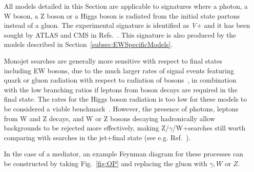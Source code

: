 
All models detailed in this Section are applicable to signatures where 
a photon, a W boson, a Z boson or a Higgs boson
is radiated from the initial state partons instead of a gluon. 
The experimental signature is identified as \textit{V+\MET} and it
has been sought by ATLAS and CMS in Refs.~\cite{Khachatryan:2014rwa,Aad:2014tda,Khachatryan:2014tva,ATLAS:2014wra,Aad:2013oja,Aad:2014vka}. 
This signature is also produced by the models described in 
Section~\ref{subsec:EWSpecificModels}. 

Monojet searches are generally more sensitive
with respect to final states including EW bosons, due to the much
larger rates of signal events featuring quark or gluon radiation with
respect to radiation of bosons~\cite{Zhou:2013fla},
in combination with the low branching ratios if leptons from
boson decays are required in the final state.
The rates for the Higgs boson radiation is too low for these models
to be considered a viable benchmark~\cite{Carpenter:2013xra}.
However, the presence of photons,
leptons from W and Z decays,
and W or Z bosons decaying hadronically
allow backgrounds to be rejected more effectively,
making Z/$\gamma$/W+\MET searches
still worth comparing with searches in the jet+\MET final state (see e.g. Ref.~\cite{Gershtein:2008bf}).

In the case of a \spinone mediator,
an example Feynman diagram for these processes can be constructed by taking
Fig.~\ref{fig:OP} and replacing the gluon with $\gamma,W$ or $Z$.


